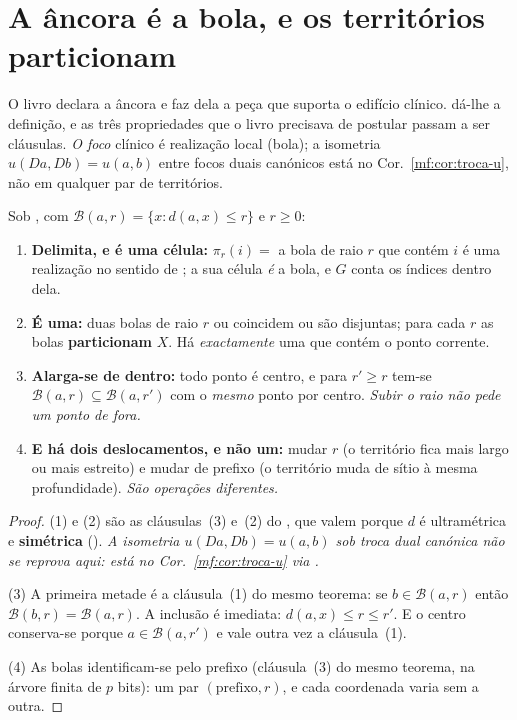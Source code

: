\documentclass[../livro.tex]{subfiles}
\begin{document}
\section{A âncora é a bola, e os territórios particionam}\label{mf:ancora}

\noindent O livro declara a âncora  e faz dela a
peça que suporta o edifício clínico.  dá-lhe a definição, e as três
propriedades que o livro precisava de postular passam a ser cláusulas. \emph{O
foco} clínico é realização local (bola); a isometria $u(Da,Db)=u(a,b)$ entre
focos duais canónicos está no Cor.~\ref{mf:cor:troca-u}, não em qualquer par de
territórios.

\begin{teorema}[o território]\label{mf:thm:ancora}
Sob , com $\mathcal{B}(a,r)=\{x:d(a,x)\le r\}$ e $r\ge0$:
\begin{enumerate}\itemsep3pt
\item[(1)] \textbf{Delimita, e é uma célula:} $\pi_r(i)=$ a bola de raio $r$ que
contém $i$ é uma realização no sentido de ; a sua célula
\emph{é} a bola, e $G$ conta os índices dentro dela.
\item[(2)] \textbf{É uma:} duas bolas de raio $r$ ou coincidem ou são disjuntas;
para cada $r$ as bolas \textbf{particionam} $X$. Há \emph{exactamente} uma que
contém o ponto corrente.
\item[(3)] \textbf{Alarga-se de dentro:} todo ponto é centro, e para
$r'\ge r$ tem-se $\mathcal{B}(a,r)\subseteq\mathcal{B}(a,r')$ com o \emph{mesmo}
ponto por centro. \emph{Subir o raio não pede um ponto de fora.}
\item[(4)] \textbf{E há dois deslocamentos, e não um:} mudar $r$ (o território
fica mais largo ou mais estreito) e mudar de prefixo (o território muda de sítio
à mesma profundidade). \emph{São operações diferentes.}
\end{enumerate}
\end{teorema}

\begin{proof}
(1) e (2) são as cláusulas~(3) e~(2) do
, que valem porque $d$ é
ultramétrica e \textbf{simétrica}
().
\emph{A isometria $u(Da,Db)=u(a,b)$ sob troca dual canónica não se reprova aqui:
está no Cor.~\ref{mf:cor:troca-u} via .}

(3) A primeira metade é a cláusula~(1) do mesmo teorema: se
$b\in\mathcal{B}(a,r)$ então $\mathcal{B}(b,r)=\mathcal{B}(a,r)$. A inclusão é
imediata: $d(a,x)\le r\le r'$. E o centro conserva-se porque
$a\in\mathcal{B}(a,r')$ e vale outra vez a cláusula~(1).

(4) As bolas identificam-se pelo prefixo (cláusula~(3) do mesmo teorema, na
árvore finita de $p$ bits): um par $(\text{prefixo},r)$, e cada coordenada varia
sem a outra.
\end{proof}
\end{document}
